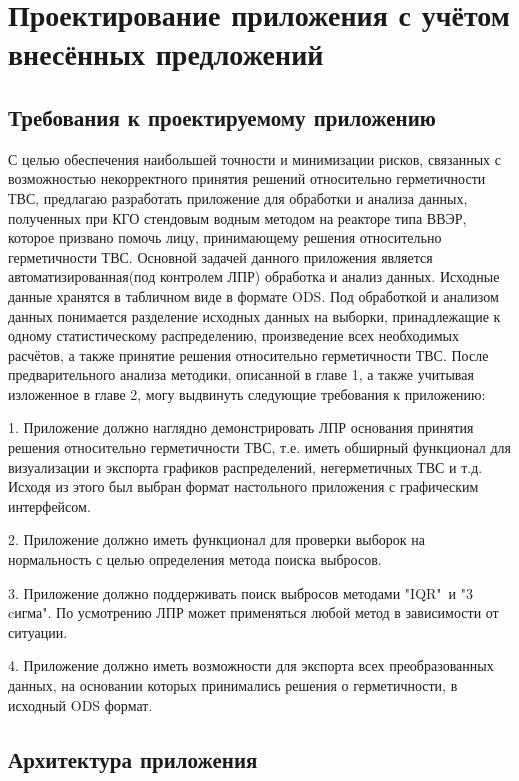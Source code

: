 
\section{Проектирование приложения с учётом внесённых предложений}

\subsection{Требования к проектируемому приложению}\label{trebovaniya}

С целью обеспечения наибольшей точности и минимизации рисков,
связанных с возможностью некорректного принятия решений относительно
герметичности ТВС, предлагаю разработать приложение для обработки и анализа данных, полученных при КГО стендовым водным методом на реакторе типа ВВЭР, которое призвано помочь лицу, принимающему решения относительно
герметичности ТВС. Основной задачей данного приложения является автоматизированная(под контролем ЛПР) обработка и анализ данных. Исходные данные хранятся в табличном виде в формате ODS. Под обработкой и анализом данных понимается разделение исходных данных на выборки, принадлежащие к
одному статистическому распределению, произведение всех необходимых
расчётов, а также принятие решения относительно герметичности ТВС. После предварительного анализа методики, описанной в главе 1, а также учитывая изложенное в главе 2, могу выдвинуть следующие требования к приложению:

1. Приложение должно наглядно демонстрировать ЛПР основания принятия
решения относительно герметичности ТВС, т.е. иметь обширный функционал
для визуализации и экспорта графиков распределений, негерметичных ТВС и т.д. Исходя из этого был выбран формат настольного приложения с графическим интерфейсом.

2. Приложение должно иметь функционал для проверки выборок на нормальность с целью определения метода поиска выбросов.

3. Приложение должно поддерживать поиск выбросов методами "IQR"\ и "3 cигма". По усмотрению ЛПР может применяться любой метод в зависимости от ситуации.

4. Приложение должно иметь возможности для экспорта всех преобразованных
данных, на основании которых принимались решения о герметичности, в
исходный ODS формат.

\subsection{Архитектура приложения}

